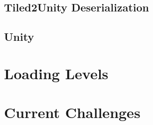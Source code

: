 \documentclass{article}
\begin{document}
\subsection{Tiled2Unity Deserialization}
\subsection{Unity}

\section{Loading Levels}

\section{Current Challenges}

\end{document}
